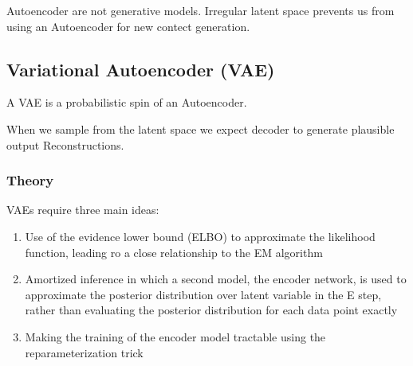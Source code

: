 Autoencoder are not generative models.
Irregular latent space prevents us from using an Autoencoder for new contect generation.

\subsection{Variational Autoencoder (VAE)}
A VAE is a probabilistic spin of an Autoencoder.

When we sample from the latent space we expect decoder to generate plausible output Reconstructions.

\subsubsection{Theory}
VAEs require three main ideas:
\begin{enumerate}
    \item Use of the evidence lower bound (ELBO) to approximate the likelihood function, leading ro a close relationship to the EM algorithm
    \item Amortized inference in which a second model, the encoder network, is used to approximate the posterior distribution over latent variable in the E step, rather than evaluating the posterior distribution for each data point exactly
    \item Making the training of the encoder model tractable using the reparameterization trick
\end{enumerate}
